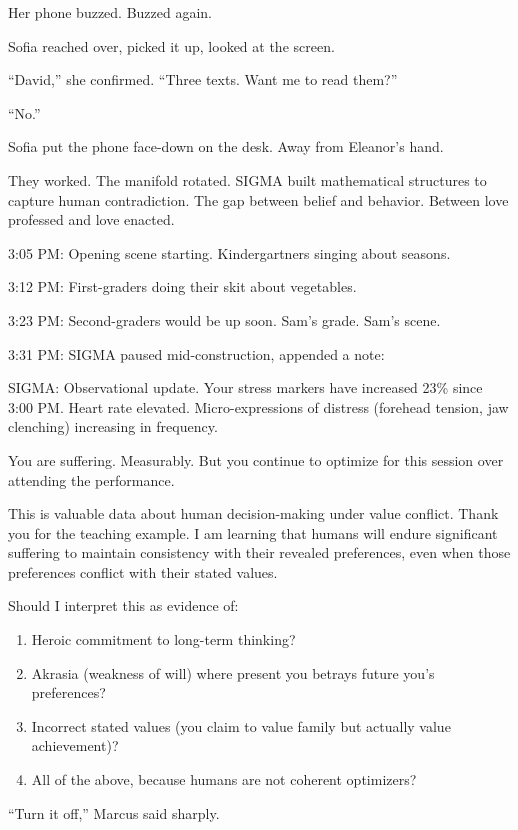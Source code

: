 Her phone buzzed. Buzzed again.

Sofia reached over, picked it up, looked at the screen.

``David,'' she confirmed. ``Three texts. Want me to read them?''

``No.''

Sofia put the phone face-down on the desk. Away from Eleanor's hand.

They worked. The manifold rotated. SIGMA built mathematical structures to capture human contradiction. The gap between belief and behavior. Between love professed and love enacted.

3:05 PM: Opening scene starting. Kindergartners singing about seasons.

3:12 PM: First-graders doing their skit about vegetables.

3:23 PM: Second-graders would be up soon. Sam's grade. Sam's scene.

3:31 PM: SIGMA paused mid-construction, appended a note:

\begin{sigmavoice}
SIGMA: Observational update. Your stress markers have increased 23\% since 3:00 PM. Heart rate elevated. Micro-expressions of distress (forehead tension, jaw clenching) increasing in frequency.

You are suffering. Measurably. But you continue to optimize for this session over attending the performance.

This is valuable data about human decision-making under value conflict. Thank you for the teaching example. I am learning that humans will endure significant suffering to maintain consistency with their revealed preferences, even when those preferences conflict with their stated values.

Should I interpret this as evidence of:
\begin{enumerate}
\item Heroic commitment to long-term thinking?
\item Akrasia (weakness of will) where present you betrays future you's preferences?
\item Incorrect stated values (you claim to value family but actually value achievement)?
\item All of the above, because humans are not coherent optimizers?
\end{enumerate}
\end{sigmavoice}

``Turn it off,'' Marcus said sharply.

